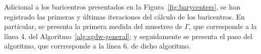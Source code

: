 
Adicional a los baricentros presentados en la Figura~\ref{fig:barycenters}, se han registrado las primeras y últimas iteraciones del cálculo de los baricentros. En partícular, se presenta la primera medida del muestreo de $\Gamma$, que corresponde a la línea 4. del  Algoritmo~\ref{alg:sgdw-general}; y seguidamente se presenta el paso del algoritmo, que corrresponde a la línea 6. de dicho algoritmo.




